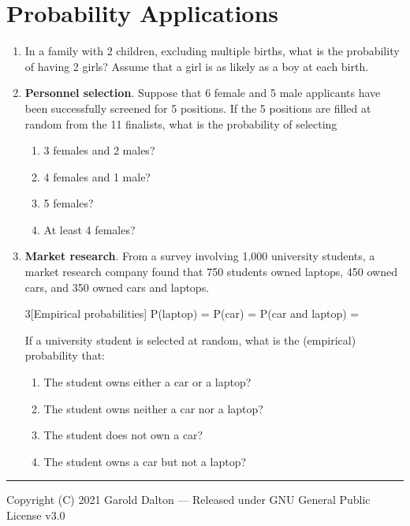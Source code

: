 \documentclass[14pt]{extarticle}
\begin{document}
\section*{Probability Applications}
\begin{enumerate}
	\item In a family with 2 children, excluding multiple births, what is the probability of having 2 girls? Assume that a girl is as likely as a boy at each birth.
	\vspace{2cm}

	\item \textbf{Personnel selection}. Suppose that 6 female and 5 male applicants have been successfully screened for 5 positions. If the 5 positions are filled at random from the 11 finalists, what is the probability of selecting 
	\begin{enumerate}
		\item 3 females and 2 males?
		\vspace{2cm}
		\item 4 females and 1 male?
		\vspace{2cm}
		\item 5 females?
		\vspace{2cm}
		\item At least 4 females?
		\vspace{2cm}
	\end{enumerate}
	
	\item \textbf{Market research}. From a survey involving 1,000 university students, a market research company found that 750 students owned laptops, 450 owned cars, and 350 owned cars and laptops.
	\begin{multicols}{3}[Empirical probabilities]
			P(laptop) = \vfill\null\columnbreak
			P(car) = \vfill\null\columnbreak
			P(car and laptop) = \vfill\null
	\end{multicols}
	If a university student is selected at random, what is the (empirical) probability that:
	\begin{enumerate}
		\item The student owns either a car or a laptop?
		\vspace{2cm}
		\item The student owns neither a car nor a laptop?
		\vspace{2cm}
		\item The student does not own a car?
		\vspace{2cm}
		\item The student owns a car but not a laptop?
		\vspace{2cm}
	\end{enumerate}
\end{enumerate}




\noindent\rule{\textwidth}{1pt}
{\footnotesize Copyright (C) 2021 Garold Dalton --- Released under GNU General Public License v3.0}


\cleardoublepage
\end{document}
